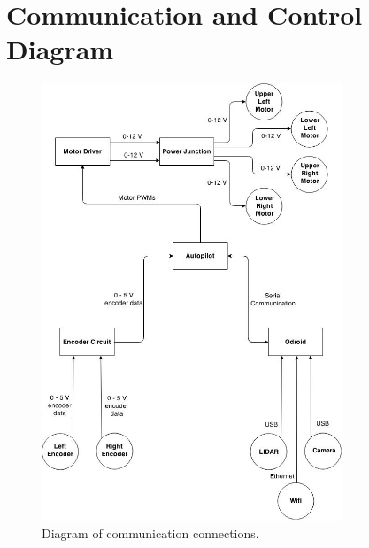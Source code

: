 \documentclass[letterpaper,12pt]{report}
\begin{document}
\section{Communication and Control Diagram}
\begin{figure}[h]
	\centering
	\includegraphics[width=0.8\textwidth]{commdiag.jpg}
	\caption{Diagram of communication connections.}
	\label{Figure 1:}
\end{figure}
\end{document}
